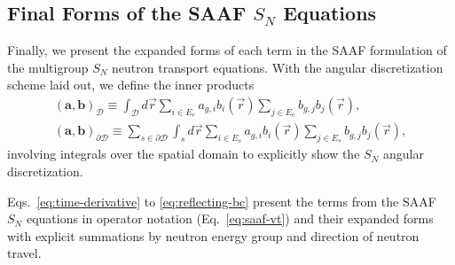 \subsection{Final Forms of the \gls{SAAF} $S_N$ Equations}

Finally, we present the expanded forms of each term in the \gls{SAAF} formulation of the multigroup
$S_N$ neutron transport equations. With the angular discretization scheme laid out, we define the
inner products
%
\begin{gather}
  \left(\bm{a},\bm{b}\right)_\mathcal{D} \equiv \int_\mathcal{D}d\vec{r}
  \sum_{i\in E_e}a_{g,i}b_i(\vec{r})\sum_{j\in E_e}b_{g,j}b_j(\vec{r}), \\
  \left(\bm{a},\bm{b}\right)_{\partial\mathcal{D}} \equiv
  \sum_{s\in\partial\mathcal{D}}\int_s d\vec{r}\sum_{i\in E_s}a_{g,i}b_i(\vec{r})\sum_{j\in E_s}
  b_{g,j}b_j(\vec{r}),
\end{gather}
%
involving integrals over the spatial domain to explicitly show the $S_N$ angular discretization.

Eqs.\ \ref{eq:time-derivative} to \ref{eq:reflecting-bc} present the terms from the \gls{SAAF}
$S_N$ equations in operator notation (Eq.\ \ref{eq:saaf-vt}) and their expanded forms
with explicit summations by neutron energy group and direction of neutron travel.

